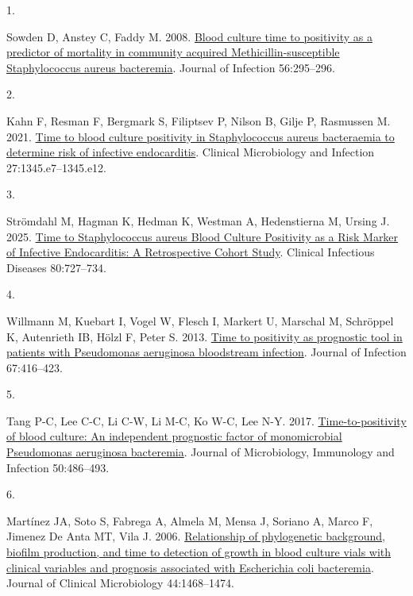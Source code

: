 \documentclass[
  11pt,
]{article}
\newlength{\cslhangindent}
\newlength{\csllabelwidth}
\newenvironment{CSLReferences}[2] %
 {\begin{list}{}{%
  \setlength{\itemindent}{0pt}
  \setlength{\leftmargin}{0pt}
  \setlength{\parsep}{0pt}
  \ifodd #1
   \setlength{\leftmargin}{\cslhangindent}
   \setlength{\itemindent}{-1\cslhangindent}
  \fi
  \setlength{\itemsep}{#2\baselineskip}}}
 {\end{list}}
\newcommand{\CSLLeftMargin}[1]{\parbox[t]{\csllabelwidth}{\strut#1\strut}}
\newcommand{\CSLRightInline}[1]{\parbox[t]{\linewidth - \csllabelwidth}{\strut#1\strut}}
\begin{document}
\protect{}\label{refs}
\begin{CSLReferences}{0}{1}
\CSLLeftMargin{1. }%
\CSLRightInline{Sowden D, Anstey C, Faddy M. 2008.
\href{https://doi.org/10.1016/j.jinf.2008.01.005}{{Blood culture time to
positivity as a predictor of mortality in community acquired
Methicillin-susceptible Staphylococcus aureus bacteremia}}. Journal of
Infection 56:295--296.}

\CSLLeftMargin{2. }%
\CSLRightInline{Kahn F, Resman F, Bergmark S, Filiptsev P, Nilson B,
Gilje P, Rasmussen M. 2021.
\href{https://doi.org/10.1016/j.cmi.2020.11.007}{{Time to blood culture
positivity in Staphylococcus aureus bacteraemia to determine risk of
infective endocarditis}}. Clinical Microbiology and Infection
27:1345.e7--1345.e12.}

\CSLLeftMargin{3. }%
\CSLRightInline{Strömdahl M, Hagman K, Hedman K, Westman A, Hedenstierna
M, Ursing J. 2025. \href{https://doi.org/10.1093/cid/ciae628}{{Time to
Staphylococcus aureus Blood Culture Positivity as a Risk Marker of
Infective Endocarditis: A Retrospective Cohort Study}}. Clinical
Infectious Diseases 80:727--734.}

\CSLLeftMargin{4. }%
\CSLRightInline{Willmann M, Kuebart I, Vogel W, Flesch I, Markert U,
Marschal M, Schröppel K, Autenrieth IB, Hölzl F, Peter S. 2013.
\href{https://doi.org/10.1016/j.jinf.2013.06.012}{{Time to positivity as
prognostic tool in patients with Pseudomonas aeruginosa bloodstream
infection}}. Journal of Infection 67:416--423.}

\CSLLeftMargin{5. }%
\CSLRightInline{Tang P-C, Lee C-C, Li C-W, Li M-C, Ko W-C, Lee N-Y.
2017.
\href{https://doi.org/10.1016/j.jmii.2015.08.014}{{Time-to-positivity of
blood culture: An independent prognostic factor of monomicrobial
Pseudomonas aeruginosa bacteremia}}. Journal of Microbiology, Immunology
and Infection 50:486--493.}

\CSLLeftMargin{6. }%
\CSLRightInline{Martínez JA, Soto S, Fabrega A, Almela M, Mensa J,
Soriano A, Marco F, Jimenez De Anta MT, Vila J. 2006.
\href{https://doi.org/10.1128/JCM.44.4.1468-1474.2006}{{Relationship of
phylogenetic background, biofilm production, and time to detection of
growth in blood culture vials with clinical variables and prognosis
associated with Escherichia coli bacteremia}}. Journal of Clinical
Microbiology 44:1468--1474.}


\end{CSLReferences}
\end{document}
